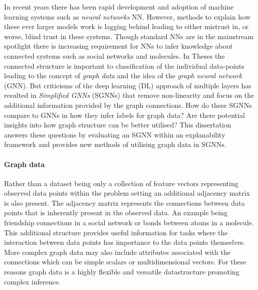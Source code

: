 In recent years there has been rapid development and adoption of machine learning systems such as \emph{neural networks} NN.
However, methods to explain how these ever larger models work is lagging behind leading to either mistrust in, or worse, blind trust in these systems.
Though standard NNs are in the mainstream spotlight there is increasing requirement for NNs to infer knowledge about connected systems such as social networks and molecules.
In Theses the connected structure is important to classification of the individual data-points leading to the concept of \emph{graph data} and the idea of the \emph{graph neural network} (GNN).
But criticisms of the deep learning (DL) approach of multiple layers has resulted in \emph{Simplified GNNs} (SGNNs) that remove non-linearity and focus on the additional information provided by the graph connections.
How do these SGNNs compare to GNNs in how they infer labels for graph data?
Are there potential insights into how graph structure can be better utilised?
This dissertation answers these questions by evaluating an SGNN within an explanability framework and provides new methods of utilising graph data in SGNNs.


\paragraph{Graph data}
Rather than a dataset being only a collection of feature vectors representing observed data points within the problem setting an additional adjacency matrix is also present.
The adjacency matrix represents the connections between data points that is inherently present in the observed data.
An example being friendship connections in a social network or bonds between atoms in a molecule.
This additional structure provides useful information for tasks where the interaction between data points has importance to the data points themselves.
More complex graph data may also include attributes associated with the connections which can be simple scalars or multidimensional vectors.
For these reasons graph data is a highly flexible and versatile datastructure promoting complex inference.


